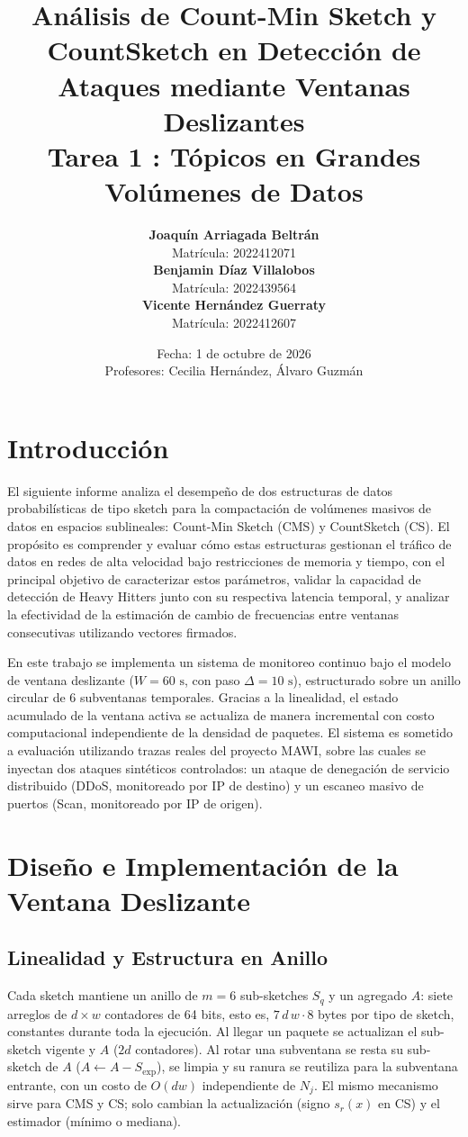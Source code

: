 \documentclass[10pt,a4paper]{article}
\title{\vspace{-1cm}\textbf{\LARGE Análisis de Count-Min Sketch y CountSketch en Detección de Ataques mediante Ventanas Deslizantes}\\[3ex]
\large Tarea 1 : Tópicos en Grandes Volúmenes de Datos}
\author{
  \textbf{Joaquín Arriagada Beltrán} \\
  {\small Matrícula: 2022412071} \\[2ex]
  \textbf{Benjamin Díaz Villalobos} \\
  {\small Matrícula: 2022439564} \\[2ex]
  \textbf{Vicente Hernández Guerraty} \\
  {\small Matrícula: 2022412607}
}
\date{\vspace{2ex} 
  Fecha: 1 de octubre de 2026 \\[1ex]
  {{Profesores:} Cecilia Hernández, Álvaro Guzmán}
}
\begin{document}
\maketitle
\vspace{1cm}

\section{Introducción}

El siguiente informe analiza el desempeño de dos estructuras de datos probabilísticas de tipo sketch para la compactación de volúmenes masivos de datos en espacios sublineales: Count-Min Sketch (CMS) y CountSketch (CS). El propósito es comprender y evaluar cómo estas estructuras gestionan el tráfico de datos en redes de alta velocidad bajo restricciones de memoria y tiempo, con el principal objetivo de caracterizar estos parámetros, validar la capacidad de detección de Heavy Hitters junto con su respectiva latencia temporal, y analizar la efectividad de la estimación de cambio de frecuencias entre ventanas consecutivas utilizando vectores firmados.


En este trabajo se implementa un sistema de monitoreo continuo bajo el modelo de ventana deslizante ($W = 60\text{ s}$, con paso $\Delta = 10\text{ s}$), estructurado sobre un anillo circular de 6 subventanas temporales. Gracias a la linealidad, el estado acumulado de la ventana activa se actualiza de manera incremental con costo computacional independiente de la densidad de paquetes. El sistema es sometido a evaluación utilizando trazas reales del proyecto MAWI, sobre las cuales se inyectan dos ataques sintéticos controlados: un ataque de denegación de servicio distribuido (DDoS, monitoreado por IP de destino) y un escaneo masivo de puertos (Scan, monitoreado por IP de origen).

\section{Diseño e Implementación de la Ventana Deslizante}
\subsection{Linealidad y Estructura en Anillo}

Cada sketch mantiene un anillo de $m=6$ sub-sketches $S_q$ y un agregado $A$: siete arreglos de $d\times w$ contadores de 64 bits, esto es, $7\,d\,w\cdot 8$ bytes por tipo de sketch, constantes durante toda la ejecución. Al llegar un paquete se actualizan el sub-sketch vigente y $A$ ($2d$ contadores). Al rotar una subventana se resta su sub-sketch de $A$ ($A\leftarrow A-S_{\text{exp}}$), se limpia y su ranura se reutiliza para la subventana entrante, con un costo de $O(dw)$ independiente de $N_j$. El mismo mecanismo sirve para CMS y CS; solo cambian la actualización (signo $s_r(x)$ en CS) y el estimador (mínimo o mediana).
\end{document}
